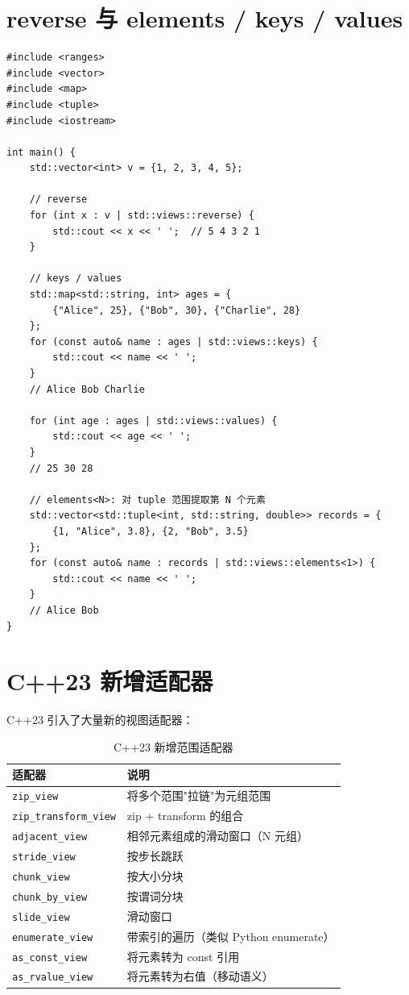 \documentclass[12pt,a4paper,fontset=fandol]{ctexbook}
\newcommand{\cpp}[1]{C++#1}
\newcommand{\Tp}[1]{\texttt{#1}}
\begin{document}
\section{reverse 与 elements / keys / values}

\begin{lstlisting}
#include <ranges>
#include <vector>
#include <map>
#include <tuple>
#include <iostream>

int main() {
    std::vector<int> v = {1, 2, 3, 4, 5};

    // reverse
    for (int x : v | std::views::reverse) {
        std::cout << x << ' ';  // 5 4 3 2 1
    }

    // keys / values
    std::map<std::string, int> ages = {
        {"Alice", 25}, {"Bob", 30}, {"Charlie", 28}
    };
    for (const auto& name : ages | std::views::keys) {
        std::cout << name << ' ';
    }
    // Alice Bob Charlie

    for (int age : ages | std::views::values) {
        std::cout << age << ' ';
    }
    // 25 30 28

    // elements<N>: 对 tuple 范围提取第 N 个元素
    std::vector<std::tuple<int, std::string, double>> records = {
        {1, "Alice", 3.8}, {2, "Bob", 3.5}
    };
    for (const auto& name : records | std::views::elements<1>) {
        std::cout << name << ' ';
    }
    // Alice Bob
}
\end{lstlisting}

\section{C++23 新增适配器}

\cpp{23} 引入了大量新的视图适配器：

\begin{table}[htbp]
\centering
\caption{C++23 新增范围适配器}
\begin{tabularx}{\textwidth}{l X}
\toprule
\textbf{适配器} & \textbf{说明} \\
\midrule
\Tp{zip\_view}           & 将多个范围"拉链"为元组范围 \\
\Tp{zip\_transform\_view}& zip + transform 的组合 \\
\Tp{adjacent\_view}      & 相邻元素组成的滑动窗口（N 元组） \\
\Tp{stride\_view}        & 按步长跳跃 \\
\Tp{chunk\_view}         & 按大小分块 \\
\Tp{chunk\_by\_view}     & 按谓词分块 \\
\Tp{slide\_view}         & 滑动窗口 \\
\Tp{enumerate\_view}     & 带索引的遍历（类似 Python enumerate） \\
\Tp{as\_const\_view}     & 将元素转为 const 引用 \\
\Tp{as\_rvalue\_view}    & 将元素转为右值（移动语义） \\
\bottomrule
\end{tabularx}
\end{table}
\end{document}
